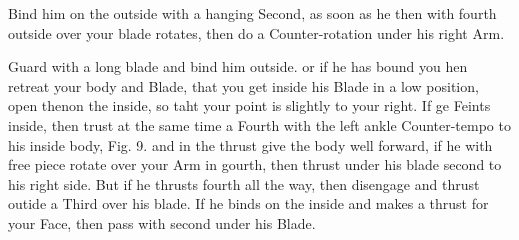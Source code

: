 \exercise{}


Bind him on the outside with a hanging Second, as soon as he then with
fourth outside over your blade rotates, then do a Counter-rotation
under his right Arm.

\exercise{}


Guard with a long blade and bind him outside. or if he has bound you
hen retreat your body and Blade, that you get inside his Blade in a
low position, open thenon the inside, so taht your point is slightly
to your right. If ge Feints inside, then trust at the same time a
Fourth with the left ankle Counter-tempo to his inside body,
Fig. 9. and in the thrust give the body well forward, if he with free
piece rotate over your Arm in gourth, then thrust under his blade
second to his right side. But if he thrusts fourth all the way, then
disengage and thrust outide a Third over his blade. If he binds on the
inside and makes a thrust for your Face, then pass with second under
his Blade.
